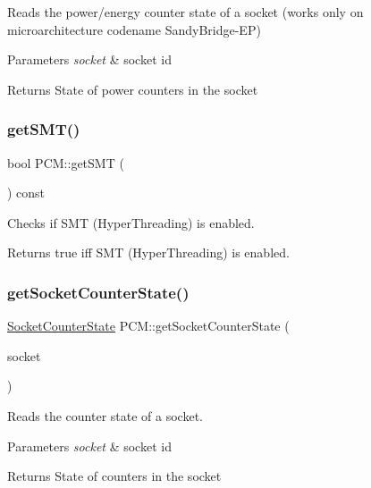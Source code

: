 Reads the power/energy counter state of a socket (works only on microarchitecture codename Sandy\+Bridge-\/\+EP) 


\begin{DoxyParams}{Parameters}
{\em socket} & socket id \\
\hline
\end{DoxyParams}
\begin{DoxyReturn}{Returns}
State of power counters in the socket 
\end{DoxyReturn}
\mbox{\label{class_p_c_m_a27548ccdca19f180dcc8acd2ca484669}} 
\subsubsection{\texorpdfstring{get\+S\+M\+T()}{getSMT()}}
{\footnotesize\ttfamily bool P\+C\+M\+::get\+S\+MT (\begin{DoxyParamCaption}{ }\end{DoxyParamCaption}) const}



Checks if S\+MT (Hyper\+Threading) is enabled. 

\begin{DoxyReturn}{Returns}
true iff S\+MT (Hyper\+Threading) is enabled. 
\end{DoxyReturn}
\mbox{\label{class_p_c_m_ade00dbbd2a71ec32ae6747bfca66cd3c}} 
\subsubsection{\texorpdfstring{get\+Socket\+Counter\+State()}{getSocketCounterState()}}
{\footnotesize\ttfamily \mbox{\hyperlink{class_socket_counter_state}{Socket\+Counter\+State}} P\+C\+M\+::get\+Socket\+Counter\+State (\begin{DoxyParamCaption}\item[{uint32}]{socket }\end{DoxyParamCaption})}



Reads the counter state of a socket. 


\begin{DoxyParams}{Parameters}
{\em socket} & socket id \\
\hline
\end{DoxyParams}
\begin{DoxyReturn}{Returns}
State of counters in the socket 
\end{DoxyReturn}
\mbox{\label{class_p_c_m_a015a39143b7bb87b41dc34b43a926029}} 
